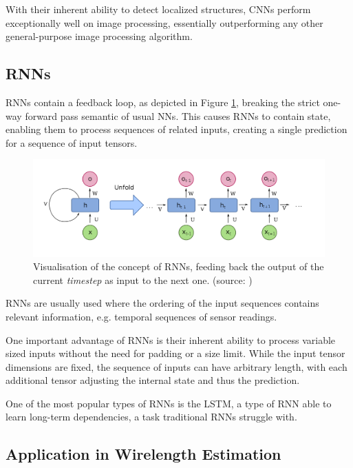 With their inherent ability to detect localized structures, \glspl{CNN} perform exceptionally well on image processing, essentially outperforming any other general-purpose image processing algorithm\cite{dl-vs-cv}\cite{cv-vs-dl}.

\subsection{\glspl{RNN}}

\glspl{RNN} contain a feedback loop, as depicted in Figure \ref{fig:recurrent-layer}, breaking the strict one-way forward pass semantic of usual \glspl{NN}. This causes \glspl{RNN} to contain state, enabling them to process sequences of related inputs, creating a single prediction for a sequence of input tensors.

\pagebreak

\begin{figure}[H]
	\includegraphics[width=\textwidth]{plots/recurrent-layer.png}
	\caption{Visualisation of the concept of \glspl{RNN}, feeding back the output of the current \textit{timestep} as input to the next one. (source: \cite{recurrent-layer-plot})}
	\label{fig:recurrent-layer}
\end{figure}

\glspl{RNN} are usually used where the ordering of the input sequences contains relevant information, e.g. temporal sequences of sensor readings.

One important advantage of \glspl{RNN} is their inherent ability to process variable sized inputs without the need for padding or a size limit. While the input tensor dimensions are fixed, the sequence of inputs can have arbitrary length, with each additional tensor adjusting the internal state and thus the prediction.

One of the most popular types of \glspl{RNN} is the \gls{LSTM}\cite{lstm-paper}, a type of \gls{RNN} able to learn long-term dependencies, a task traditional \glspl{RNN} struggle with\cite{lstm-web}.

\subsection{Application in Wirelength Estimation}

